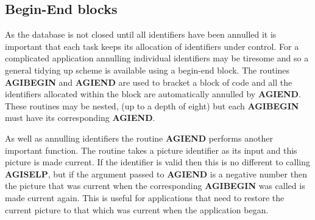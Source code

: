 \documentclass[twoside,11pt]{article}
\newcommand{\htmlref}[2]{#1}
\renewcommand{\_}{\texttt{\symbol{95}}}
\begin{document}
\subsection{Begin-End blocks\label{bend}}
As the database is not closed until all identifiers have been annulled
it is important that each task keeps its allocation of identifiers
under control. For a complicated application annulling individual
identifiers may be tiresome and so a general tidying up scheme is
available using a begin-end block. The routines 
\htmlref{{\bf AGI\_BEGIN}}{AGI_BEGIN} and
\htmlref{{\bf AGI\_END}}{AGI_END}
are used to bracket a block of code and all the
identifiers allocated within the block are automatically annulled
by {\bf AGI\_END}. These routines may be nested, (up to a depth of eight)
but each {\bf AGI\_BEGIN} must have its corresponding {\bf AGI\_END}.

As well as annulling identifiers the routine {\bf AGI\_END} performs another
important function. The routine takes a picture identifier as its input
and this picture is made current. If the identifier is valid then this is
no different to calling \htmlref{{\bf AGI\_SELP}}{AGI_SELP}, 
but if the argument passed to
{\bf AGI\_END} is a negative number then the picture that was current when
the corresponding {\bf AGI\_BEGIN} was called is made current again. This
is useful for applications that need to restore the current picture to
that which was current when the application began.
\end{document}
